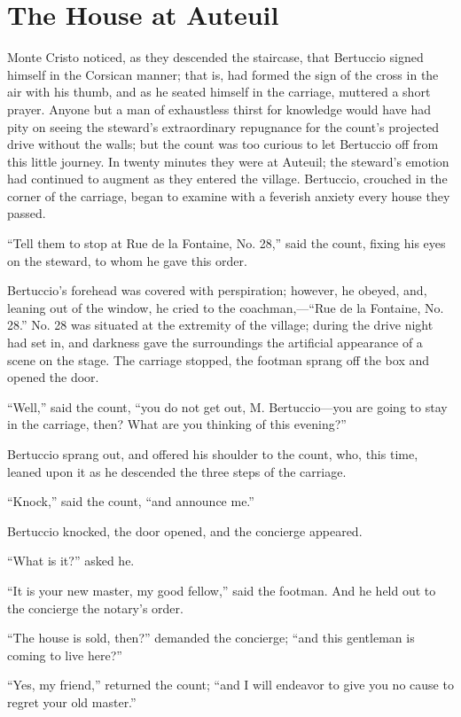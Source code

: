 \chapter{The House at Auteuil}

Monte Cristo noticed, as they descended the staircase, that Bertuccio
signed himself in the Corsican manner; that is, had formed the sign of
the cross in the air with his thumb, and as he seated himself in the
carriage, muttered a short prayer. Anyone but a man of exhaustless
thirst for knowledge would have had pity on seeing the steward’s
extraordinary repugnance for the count’s projected drive without the
walls; but the count was too curious to let Bertuccio off from this
little journey. In twenty minutes they were at Auteuil; the steward’s
emotion had continued to augment as they entered the village.
Bertuccio, crouched in the corner of the carriage, began to examine
with a feverish anxiety every house they passed.

“Tell them to stop at Rue de la Fontaine, No. 28,” said the count,
fixing his eyes on the steward, to whom he gave this order.

Bertuccio’s forehead was covered with perspiration; however, he obeyed,
and, leaning out of the window, he cried to the coachman,—“Rue de la
Fontaine, No. 28.” No. 28 was situated at the extremity of the village;
during the drive night had set in, and darkness gave the surroundings
the artificial appearance of a scene on the stage. The carriage
stopped, the footman sprang off the box and opened the door.

“Well,” said the count, “you do not get out, M. Bertuccio—you are going
to stay in the carriage, then? What are you thinking of this evening?”

Bertuccio sprang out, and offered his shoulder to the count, who, this
time, leaned upon it as he descended the three steps of the carriage.

“Knock,” said the count, “and announce me.”

Bertuccio knocked, the door opened, and the concierge appeared.

“What is it?” asked he.

“It is your new master, my good fellow,” said the footman. And he held
out to the concierge the notary’s order.

“The house is sold, then?” demanded the concierge; “and this gentleman
is coming to live here?”

“Yes, my friend,” returned the count; “and I will endeavor to give you
no cause to regret your old master.”


